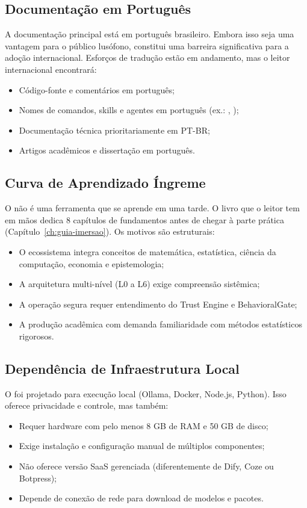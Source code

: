 \subsection{Documentação em Português}
A documentação principal está em português brasileiro. Embora isso seja
uma vantagem para o público lusófono, constitui uma barreira
significativa para a adoção internacional. Esforços de tradução estão
em andamento, mas o leitor internacional encontrará:
\begin{itemize}
\item Código-fonte e comentários em português;
\item Nomes de comandos, skills e agentes em português
(ex.: , );
\item Documentação técnica prioritariamente em PT-BR;
\item Artigos acadêmicos e dissertação em português.
\end{itemize}
\subsection{Curva de Aprendizado Íngreme}
O \opencodeeco{} não é uma ferramenta que se aprende em uma tarde. O
livro que o leitor tem em mãos dedica 8 capítulos de fundamentos antes
de chegar à parte prática (Capítulo~\ref{ch:guia-imersao}). Os motivos
são estruturais:
\begin{itemize}
\item O ecossistema integra conceitos de matemática, estatística,
ciência da computação, economia e epistemologia;
\item A arquitetura multi-nível (L0 a L6) exige compreensão
sistêmica;
\item A operação segura requer entendimento do Trust Engine e
BehavioralGate;
\item A produção acadêmica com \qualisA{} demanda familiaridade
com métodos estatísticos rigorosos.
\end{itemize}
\subsection{Dependência de Infraestrutura Local}
O \opencodeeco{} foi projetado para execução local (Ollama, Docker,
Node.js, Python). Isso oferece privacidade e controle, mas também:
\begin{itemize}
\item Requer hardware com pelo menos 8 GB de RAM e 50 GB de disco;
\item Exige instalação e configuração manual de múltiplos
componentes;
\item Não oferece versão SaaS gerenciada (diferentemente de Dify,
Coze ou Botpress);
\item Depende de conexão de rede para download de modelos e
pacotes.
\end{itemize}
